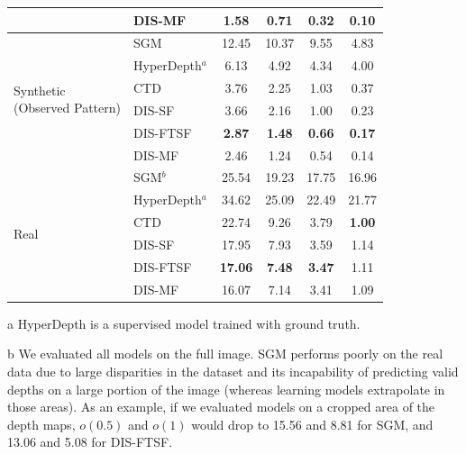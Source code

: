 \begin{table}[!t]
\begin{center}
\begin{threeparttable}
\begin{tabular}{l|lcccc}
        & DIS-MF & \phantom{0}1.58 & \phantom{0}0.71 & \phantom{0}0.32 & \phantom{0}0.10 \\
        \hline
        \hline
        \multirow{6}{*}{ \parbox{20ex}{Synthetic \\ (Observed Pattern)} } & SGM & 12.45 & 10.37 & \phantom{0}9.55 & \phantom{0}4.83 \\
        & HyperDepth$^a$ & \phantom{0}6.13 & \phantom{0}4.92 & \phantom{0}4.34 & \phantom{0}4.00 \\
        & CTD & \phantom{0}3.76 & \phantom{0}2.25 & \phantom{0}1.03 & \phantom{0}0.37 \\
        & DIS-SF & \phantom{0}3.66 & \phantom{0}2.16 & \phantom{0}1.00 & \phantom{0}0.23 \\
        & DIS-FTSF & \phantom{0}\textbf{2.87} & \phantom{0}\textbf{1.48} & \phantom{0}\textbf{0.66} & \phantom{0}\textbf{0.17} \\ \arrayrulecolor{lightgray}\cline{2-6}\arrayrulecolor{black}
        & DIS-MF & \phantom{0}2.46 & \phantom{0}1.24 & \phantom{0}0.54 & \phantom{0}0.14 \\
        \hline
        \hline
        \multirow{6}{*}{\parbox{20ex}{Real}} & SGM$^b$ & 25.54 & 19.23 & 17.75 & 16.96 \\
        & HyperDepth$^a$ & 34.62 & 25.09 & 22.49 & 21.77 \\
        & CTD & 22.74 & \phantom{0}9.26 & \phantom{0}3.79 & \phantom{0}\textbf{1.00} \\
        & DIS-SF & 17.95 & \phantom{0}7.93 & \phantom{0}3.59 & \phantom{0}1.14 \\
        & DIS-FTSF & \textbf{17.06} & \phantom{0}\textbf{7.48} & \phantom{0}\textbf{3.47} & \phantom{0}1.11 \\ \arrayrulecolor{lightgray}\cline{2-6}\arrayrulecolor{black}
        & DIS-MF & 16.07 & \phantom{0}7.14 & \phantom{0}3.41 & \phantom{0}1.09 \\
        \hline
        \end{tabular}
        \begin{tablenotes}
        \item[a] HyperDepth is a supervised model trained with ground truth.
        \item[b] We evaluated all models on the full image. SGM performs poorly on the real data due to large disparities in the dataset and its incapability of predicting valid depths on a large portion of the image (whereas learning models extrapolate in those areas). As an example, if we evaluated models on a cropped area of the depth maps, $o(0.5)$ and $o(1)$ would drop to 15.56 and 8.81 for SGM, and 13.06 and 5.08 for DIS-FTSF.

\end{tablenotes}
\end{threeparttable}
\end{center}
\end{table}

